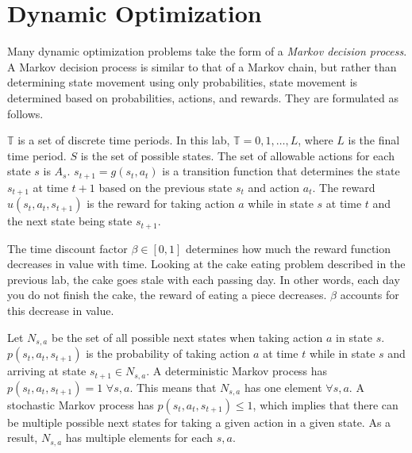 
\section*{Dynamic Optimization}

Many dynamic optimization problems take the form of a \emph{Markov decision process}.
A Markov decision process is similar to that of a Markov chain, but rather than determining state movement using only probabilities, state movement is determined based on probabilities, actions, and rewards.
They are formulated as follows.

$\mathbb{T}$ is a set of discrete time periods.
In this lab, $\mathbb{T} = {0,1,\ldots, L}$, where $L$ is the final time period. 
$S$ is the set of possible states.
The set of allowable actions for each state $s$ is $A_s$.
$s_{t+1}=g(s_t,a_t)$ is a transition function that determines the state $s_{t+1}$ at time $t+1$ based on the previous state $s_t$ and action $a_t$.
The reward $u(s_t,a_t,s_{t+1})$ is the reward for taking action $a$ while in state $s$ at time $t$ and the next state being state $s_{t+1}$.

The time discount factor $\beta \in [0,1]$ determines how much the reward function decreases in value with time. 
Looking at the cake eating problem described in the previous lab, the cake goes stale with each passing day.
In other words, each day you do not finish the cake, the reward of eating a piece decreases.
$\beta$ accounts for this decrease in value.

Let $N_{s,a}$ be the set of all possible next states when taking action $a$ in state $s$.
$p(s_t,a_t,s_{t+1})$ is the probability of taking action $a$ at time $t$ while in state $s$ and arriving at state $s_{t+1}\in N_{s,a}$.
A deterministic Markov process has $p(s_t,a_t,s_{t+1}) = 1$ $\forall s,a$.
This means that $N_{s,a}$ has one element $\forall s,a$.
A stochastic Markov process has $p(s_t,a_t,s_{t+1})\leq 1$, which implies that there can be multiple possible next states for taking a given action in a given state.
As a result, $N_{s,a}$ has multiple elements for each $s,a$. 

